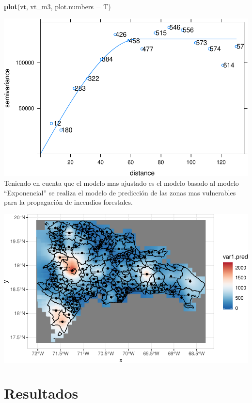 \documentclass[11pt,]{article}
\newenvironment{Shaded}{\begin{snugshade}}{\end{snugshade}}
\newcommand{\KeywordTok}[1]{\textcolor[rgb]{0.13,0.29,0.53}{\textbf{#1}}}
\newcommand{\DataTypeTok}[1]{\textcolor[rgb]{0.13,0.29,0.53}{#1}}
\newcommand{\NormalTok}[1]{#1}
\begin{document}
\begin{Shaded}
\begin{Highlighting}[]
\KeywordTok{plot}\NormalTok{(vt, vt_m3, }\DataTypeTok{plot.numbers =}\NormalTok{ T)}
\end{Highlighting}
\end{Shaded}

\includegraphics{proyecto_files/figure-latex/unnamed-chunk-55-4.pdf}
Teniendo en cuenta que el modelo mas ajustado es el modelo basado al
modelo ``Exponencial'' se realiza el modelo de predicción de las zonas
mas vulnerables para la propagación de incendios forestales.

\includegraphics{proyecto_files/figure-latex/unnamed-chunk-57-1.pdf}

\section{Resultados}\label{resultados}
\end{document}
